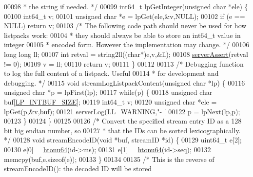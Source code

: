 \begin{DoxyCode}
00098 \textcolor{comment}{ * the string if needed. */}
00099 int64\_t lpGetInteger(\textcolor{keywordtype}{unsigned} \textcolor{keywordtype}{char} *ele) \{
00100     int64\_t v;
00101     \textcolor{keywordtype}{unsigned} \textcolor{keywordtype}{char} *e = lpGet(ele,&v,NULL);
00102     \textcolor{keywordflow}{if} (e == NULL) \textcolor{keywordflow}{return} v;
00103     \textcolor{comment}{/* The following code path should never be used for how listpacks work:}
00104 \textcolor{comment}{     * they should always be able to store an int64\_t value in integer}
00105 \textcolor{comment}{     * encoded form. However the implementation may change. */}
00106     \textcolor{keywordtype}{long} \textcolor{keywordtype}{long} ll;
00107     \textcolor{keywordtype}{int} retval = string2ll((\textcolor{keywordtype}{char}*)e,v,&ll);
00108     \hyperlink{server_8h_a88114b5169b4c382df6b56506285e56a}{serverAssert}(retval != 0);
00109     v = ll;
00110     \textcolor{keywordflow}{return} v;
00111 \}
00112 
00113 \textcolor{comment}{/* Debugging function to log the full content of a listpack. Useful}
00114 \textcolor{comment}{ * for development and debugging. */}
00115 \textcolor{keywordtype}{void} streamLogListpackContent(\textcolor{keywordtype}{unsigned} \textcolor{keywordtype}{char} *lp) \{
00116     \textcolor{keywordtype}{unsigned} \textcolor{keywordtype}{char} *p = lpFirst(lp);
00117     \textcolor{keywordflow}{while}(p) \{
00118         \textcolor{keywordtype}{unsigned} \textcolor{keywordtype}{char} buf[\hyperlink{listpack_8h_ab31e5c173b595ae4e703b72eb435a6e9}{LP\_INTBUF\_SIZE}];
00119         int64\_t v;
00120         \textcolor{keywordtype}{unsigned} \textcolor{keywordtype}{char} *ele = lpGet(p,&v,buf);
00121         serverLog(\hyperlink{server_8h_a31229b9334bba7d6be2a72970967a14b}{LL\_WARNING},\textcolor{stringliteral}{"- [%
00122         p = lpNext(lp,p);
00123     \}
00124 \}
00125 
00126 \textcolor{comment}{/* Convert the specified stream entry ID as a 128 bit big endian number, so}
00127 \textcolor{comment}{ * that the IDs can be sorted lexicographically. */}
00128 \textcolor{keywordtype}{void} streamEncodeID(\textcolor{keywordtype}{void} *buf, streamID *id) \{
00129     uint64\_t e[2];
00130     e[0] = \hyperlink{endianconv_8h_a41a6b64ba8dec362f605f615e528fcf3}{htonu64}(id->ms);
00131     e[1] = \hyperlink{endianconv_8h_a41a6b64ba8dec362f605f615e528fcf3}{htonu64}(id->seq);
00132     memcpy(buf,e,\textcolor{keyword}{sizeof}(e));
00133 \}
00134 
00135 \textcolor{comment}{/* This is the reverse of streamEncodeID(): the decoded ID will be stored}
}
\end{DoxyCode}

